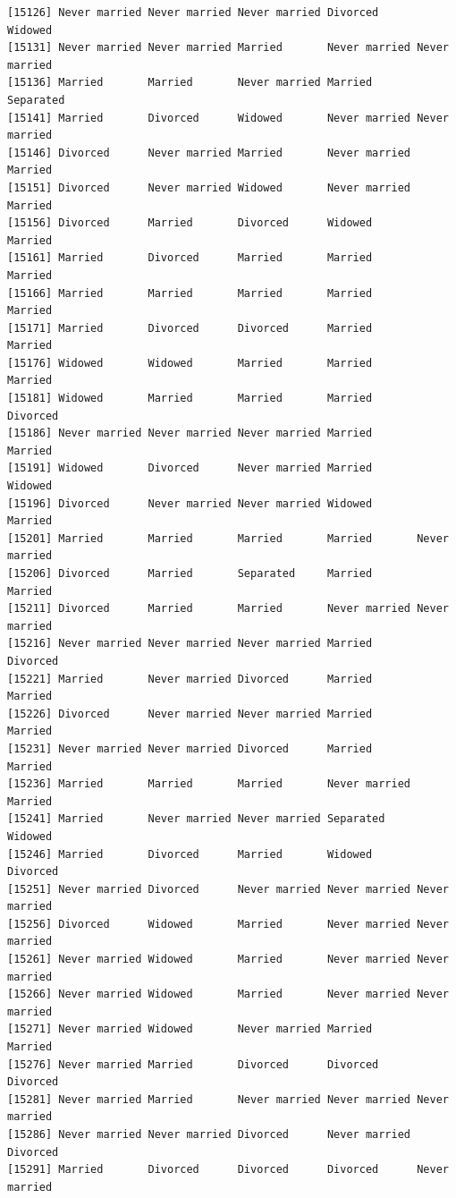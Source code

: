 \documentclass[
  letterpaper,
  DIV=11,
  numbers=noendperiod,
  oneside]{scrartcl}
\begin{document}
\begin{verbatim}
[15126] Never married Never married Never married Divorced      Widowed      
[15131] Never married Never married Married       Never married Never married
[15136] Married       Married       Never married Married       Separated    
[15141] Married       Divorced      Widowed       Never married Never married
[15146] Divorced      Never married Married       Never married Married      
[15151] Divorced      Never married Widowed       Never married Married      
[15156] Divorced      Married       Divorced      Widowed       Married      
[15161] Married       Divorced      Married       Married       Married      
[15166] Married       Married       Married       Married       Married      
[15171] Married       Divorced      Divorced      Married       Married      
[15176] Widowed       Widowed       Married       Married       Married      
[15181] Widowed       Married       Married       Married       Divorced     
[15186] Never married Never married Never married Married       Married      
[15191] Widowed       Divorced      Never married Married       Widowed      
[15196] Divorced      Never married Never married Widowed       Married      
[15201] Married       Married       Married       Married       Never married
[15206] Divorced      Married       Separated     Married       Married      
[15211] Divorced      Married       Married       Never married Never married
[15216] Never married Never married Never married Married       Divorced     
[15221] Married       Never married Divorced      Married       Married      
[15226] Divorced      Never married Never married Married       Married      
[15231] Never married Never married Divorced      Married       Married      
[15236] Married       Married       Married       Never married Married      
[15241] Married       Never married Never married Separated     Widowed      
[15246] Married       Divorced      Married       Widowed       Divorced     
[15251] Never married Divorced      Never married Never married Never married
[15256] Divorced      Widowed       Married       Never married Never married
[15261] Never married Widowed       Married       Never married Never married
[15266] Never married Widowed       Married       Never married Never married
[15271] Never married Widowed       Never married Married       Married      
[15276] Never married Married       Divorced      Divorced      Divorced     
[15281] Never married Married       Never married Never married Never married
[15286] Never married Never married Divorced      Never married Divorced     
[15291] Married       Divorced      Divorced      Divorced      Never married

\end{verbatim}
\end{document}
